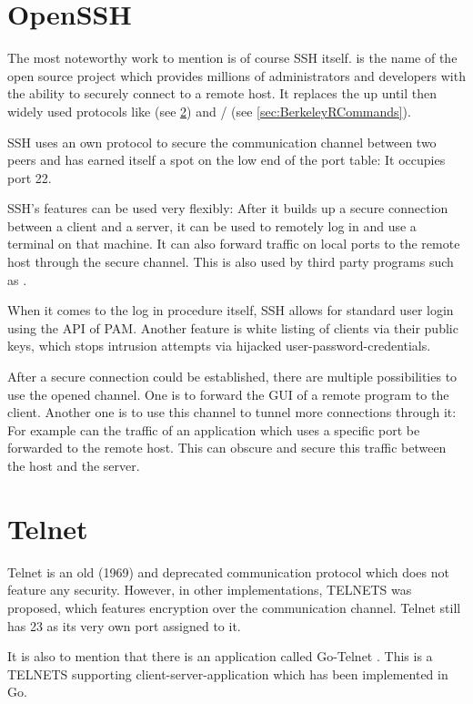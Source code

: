 \documentclass[10pt,a4paper,titlepage,twoside,english,final]{zhawreprt}
\begin{document}
\section{OpenSSH}\label{sec:OpenSSH}
The most noteworthy work to mention is of course \gls{SSH} itself.
\cite{openssh} is the name of the open source project which provides millions of administrators and developers with the ability to securely connect to a remote host.
It replaces the up until then widely used protocols like \cite{telnet} (see \ref{sec:Telnet}) and \cite{rlogin}/\cite{rsh} (see \ref{sec:BerkeleyRCommands}).

\gls{SSH} uses an own protocol to secure the communication channel between two peers and has earned itself a spot on the low end of the \gls{port} table:
It occupies \gls{port} 22.

\gls{SSH}'s features can be used very flexibly:
After it builds up a secure connection between a client and a server, it can be used to remotely log in and use a \gls{terminal} on that machine.
It can also forward traffic on local ports to the remote host through the secure channel.
This is also used by third party programs such as \cite{rsync}.

When it comes to the log in procedure itself, \gls{SSH} allows for standard user \gls{login} using the \gls{API} of \gls{PAM}.
Another feature is white listing of clients via their public keys, which stops intrusion attempts via hijacked user-password-credentials.

After a secure connection could be established, there are multiple possibilities to use the opened channel.
One is to forward the \gls{GUI} of a remote program to the client.
Another one is to use this channel to tunnel more connections through it:
For example can the traffic of an application which uses a specific \gls{port} be forwarded to the remote host.
This can obscure and secure this traffic between the host and the server.

\section{Telnet}\label{sec:Telnet}
Telnet \citep{rfc15,rfc854} is an old (1969) and deprecated communication protocol which does not feature any security.
However, in other implementations, \gls{TELNETS} was proposed, which features encryption over the communication channel.
Telnet still has 23 as its very own \gls{port} assigned to it.

It is also to mention that there is an application called Go-Telnet \citep{gotelnet}.
This is a \gls{TELNETS} supporting client-server-application which has been implemented in \gls{Go}.
\end{document}
